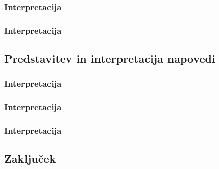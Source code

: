 \documentclass[11pt,a4paper]{article}
\begin{document}
\subsubsection{Interpretacija}

\subsubsection{Interpretacija}
\subsection{Predstavitev in interpretacija napovedi}

\subsubsection{Interpretacija}

\subsubsection{Interpretacija}

\subsubsection{Interpretacija}
\subsection{Zaključek}
\end{document}
